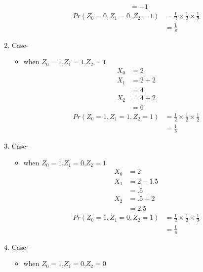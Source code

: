\documentclass[11pt,a4paper,twocolumn]{article}
\begin{document}
\begin{enumerate}
\begin{itemize}
\begin{align*}
            &=-1
        \end{align*}
        \begin{align*}
            Pr(Z_{0}=0,Z_{1}=0,Z_{2}=1)&=\frac{1}{2}\times\frac{1}{2}\times\frac{1}{2}\\
            &=\frac{1}{8}
        \end{align*}
    \end{itemize}
    \item Case-
    \begin{itemize}
        \item when $Z_{0}=1$,$Z_{1}=1$,$Z_{2}=1$\\
        \begin{align*}
            X_{0}&=2\\
            X_{1}&=2+2\\
            &=4\\
            X_{2}&=4+2\\
            &=6
        \end{align*}
        \begin{align*}
            Pr(Z_{0}=1,Z_{1}=1,Z_{2}=1)&=\frac{1}{2}\times\frac{1}{2}\times\frac{1}{2}\\
            &=\frac{1}{8}
        \end{align*}
    \end{itemize}
     \item Case-
    \begin{itemize}
        \item when $Z_{0}=1$,$Z_{1}=0$,$Z_{2}=1$\\
        \begin{align*}
            X_{0}&=2\\
            X_{1}&=2-1.5\\
            &=.5\\
            X_{2}&=.5+2\\
            &=2.5
        \end{align*}
        \begin{align*}
            Pr(Z_{0}=1,Z_{1}=0,Z_{2}=1)&=\frac{1}{2}\times\frac{1}{2}\times\frac{1}{2}\\
            &=\frac{1}{8}
        \end{align*}
    \end{itemize}
     \item Case-
    \begin{itemize}
        \item when $Z_{0}=1$,$Z_{1}=0$,$Z_{2}=0$\\

\end{itemize}
\end{enumerate}
\end{document}
